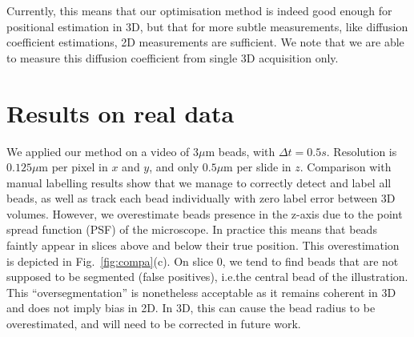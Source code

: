 \documentclass{llncs}
\begin{document}
Currently, this means that our optimisation method is indeed good enough for positional estimation in 3D, but that for more subtle measurements, like diffusion coefficient estimations, 2D measurements are sufficient. We note that we are able to measure this diffusion coefficient from single 3D acquisition only.

\section{Results on real data}
We applied our method on a video of 3$\mu$m beads, with $\Delta t=0.5s$. Resolution is $0.125\mu\text{m}$ per pixel in $x$ and $y$, and only $0.5\mu\text{m}$ per slide in $z$. Comparison with manual labelling results show that we manage to correctly detect and label all beads, as well as track each bead individually with zero label error between 3D volumes. However, we overestimate beads presence in the z-axis due to the point spread function (PSF) of the microscope. In practice this means that beads faintly appear in slices above and below their true position. This overestimation is depicted in Fig.~\ref{fig:compa}(c). On slice 0, we tend to find beads that are not supposed to be segmented (false positives), i.e.the central bead of the illustration. This ``oversegmentation'' is nonetheless acceptable as it remains coherent in 3D and does not imply bias in 2D. In 3D, this can cause the bead radius to be overestimated, and will need to be corrected in future work.
\end{document}
